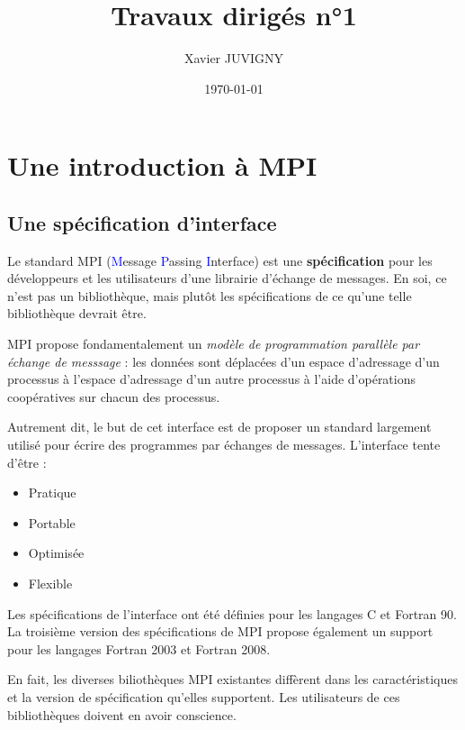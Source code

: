 \documentclass[11pt,a4paper]{article}
\author{Xavier JUVIGNY}
\date{\today}
\title{Travaux dirigés n°1}
\begin{document}
\lstset{escapechar=@,style=customcpp}

\maketitle
\tableofcontents


\section{Une introduction à MPI} 
\subsection{Une spécification d'interface}

Le standard MPI (\textcolor{blue}{M}essage \textcolor{blue}{P}assing \textcolor{blue}{I}nterface) est une 
\textbf{sp\'ecification} pour les d\'eveloppeurs et
les utilisateurs d'une librairie d'\'echange de messages. En soi, ce n'est pas un bibliothèque, mais plut\^ot
les sp\'ecifications de ce qu'une telle biblioth\`eque devrait \^etre.

MPI propose fondamentalement un \textsl{mod\`ele de programmation parall\`ele par \'echange de messsage} : les donn\'ees sont d\'eplac\'ees
d'un espace d'adressage d'un processus \`a l'espace d'adressage d'un autre processus \`a l'aide d'op\'erations
coop\'eratives sur chacun des processus.

Autrement dit, le but de cet interface est de proposer un standard largement utilis\'e
pour \'ecrire des programmes par \'echanges de messages. L'interface tente d'\^etre :
\begin{itemize}
\item Pratique
\item Portable
\item Optimis\'ee
\item Flexible
\end{itemize}

Les sp\'ecifications de l'interface ont \'et\'e d\'efinies pour les langages C et Fortran 90. 
La troisi\`eme version des
sp\'ecifications de MPI propose \'egalement un support pour les langages Fortran 2003 et Fortran 2008.

En fait, les diverses bilioth\`eques MPI existantes diff\`erent dans les caract\'eristiques et la version de
sp\'ecification qu'elles supportent. Les utilisateurs de ces biblioth\`eques doivent en avoir conscience.
\end{document}
